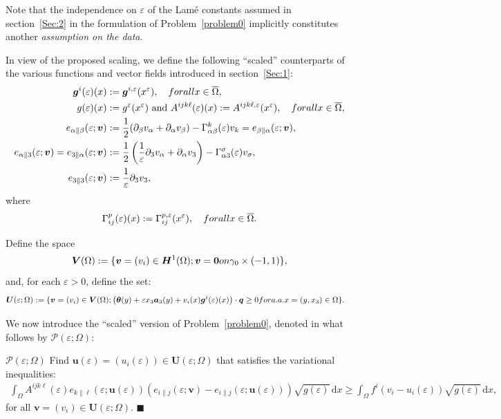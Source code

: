 \documentclass{amsart}
\newcommand*{\bqed}{\hfill\ensuremath{\blacksquare}}%
\def\dd{\, \mathrm{d}}
\begin{document}
Note that the independence on $\varepsilon$ of the Lam\'{e} constants assumed in section~\ref{Sec:2} in the formulation of Problem~\ref{problem0} implicitly constitutes another \emph{assumption on the data}.

In view of the proposed scaling, we define the following ``scaled'' counterparts of the various functions and vector fields introduced in section~\ref{Sec:1}:
\begin{align*}
	\bm{g}^i(\varepsilon)(x)&:=\bm{g}^{i,\varepsilon}(x^\varepsilon),\quad \textup{ for all } x\in \overline{\Omega},\\
	g(\varepsilon)(x) &:= g^\varepsilon(x^\varepsilon)\text{ and } A^{ijk\ell}(\varepsilon)(x):=A^{ijk\ell, \varepsilon}(x^\varepsilon),\quad\textup{ for all } x\in \overline{\Omega},\\
	e_{\alpha\|\beta}(\varepsilon;\bm{v})&:=\frac{1}{2}(\partial_\beta v_\alpha + \partial_\alpha v_\beta)-\Gamma^k_{\alpha\beta}(\varepsilon) v_k = e_{\beta\|\alpha}(\varepsilon;\bm{v}),\\
	e_{\alpha\|3}(\varepsilon;\bm{v})=e_{3\|\alpha}(\varepsilon;\bm{v}) &:=\frac{1}{2}\left(\frac{1}{\varepsilon}\partial_3 v_\alpha+\partial_\alpha v_3\right)-\Gamma^\sigma_{\alpha3}(\varepsilon) v_\sigma,\\
	e_{3\| 3}(\varepsilon;\bm{v}) &:= \frac{1}{\varepsilon}\partial_3 v_3,
\end{align*}
where
$$
\Gamma^p_{ij}(\varepsilon)(x):=\Gamma^{p,\varepsilon}_{ij}(x^\varepsilon),\quad \textup{ for all } x\in\overline{\Omega}.
$$

Define the space
$$
\bm{V}(\Omega):=\{\bm{v}=(v_i)\in\bm{H}^1(\Omega);\bm{v}=\bm{0}\textup{ on }\gamma_0\times (-1,1)\},
$$
and, for each $\varepsilon > 0$,  define the set:
\begin{align*}
	\bm{U}(\varepsilon;\Omega)&:=\{\bm{v}=(v_i)\in\bm{V}(\Omega);\big(\bm{\theta}(y)+\varepsilon x_3 \bm{a}_3(y)+v_i(x)\bm{g}^i(\varepsilon)(x)\big)\cdot\bm{q}\ge 0 \textup{ for a.a. } x=(y,x_3)\in\Omega\}.
\end{align*}

We now introduce the ``scaled'' version of Problem~\ref{problem0}, denoted in what follows by $\mathcal{P}(\varepsilon;\Omega)$:

\begin{customprob}{$\mathcal{P}(\varepsilon; \Omega)$}
\label{problem0scaled}
Find $\bm{u}(\varepsilon)=(u_i(\varepsilon)) \in \bm{U}(\varepsilon; \Omega)$ that satisfies the variational inequalities:
\begin{align*}
	\int_{\Omega} A^{ijk\ell}(\varepsilon) e_{k\| \ell} (\varepsilon; \bm{u}(\varepsilon)) \left(e_{i\| j}(\varepsilon; \bm{v}) - e_{i\|j} (\varepsilon; \bm{u}(\varepsilon))\right) \sqrt{g(\varepsilon)} \dd x
	\ge \int_{\Omega} f^i (v_i - u_i(\varepsilon)) \sqrt{g(\varepsilon)} \dd x,
\end{align*}
for all $\bm{v}=(v_i) \in \bm{U}(\varepsilon;\Omega)$.
\bqed
\end{customprob}
\end{document}
